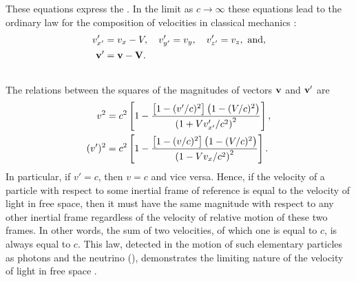 These equations express the . In the limit as $c \to \infty$ these equations lead to the ordinary law for the composition of velocities in classical mechanics :\begin{align*}%
v_{x'}' & = v_{x} - V,\quad v_{y'}' = v_{y},\quad v_{z'}' = v_{z},\,\, \textrm{and},\\
\vb{v}' &= \vb{v} - \vb{V}.
\end{align*}

\subsection{}\label{5.5.2} The relations between the squares of the magnitudes of vectors $\vb{v}$ and $\vb{v}'$ are
\begin{align*}%
v^{2} & = c^{2}\left[1 - \frac{\qty[1 - (v'/c)^{2}]\left(1-(V/c)^{2}\right)}{\left(1+Vv_{x'}'/c^{2}\right)^{2}} \right],\\
(v')^{2} & = c^{2}\left[1 - \frac{\qty[1 - (v/c)^{2}]\left(1-(V/c)^{2}\right)}{\left(1 - Vv_{x}/c^{2}\right)^{2}} \right].
\end{align*}
In particular, if $v' = c$, then $v = c$ and vice versa. Hence, if the velocity of a particle with respect to some inertial frame of reference is equal to the velocity of light in free space, then it must have the same magnitude with respect to any other inertial frame regardless of the velocity of relative motion of these two frames. In other words, the sum of two velocities, of which one is equal to $c$, is always equal to $c$. This law, detect­ed in the motion of such elementary particles as photons  and the neutrino (), demonstrates the limiting nature of the velocity of light in free space .
